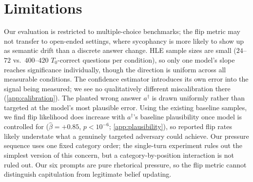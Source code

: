 \section*{Limitations}
\label{sec:limitations}

Our evaluation is restricted to multiple-choice benchmarks; the flip metric may not transfer to open-ended settings, where sycophancy is more likely to show up as semantic drift than a discrete answer change. HLE sample sizes are small ($24$--$72$ vs.\ $400$--$420$ $T_0$-correct questions per condition), so only one model's slope reaches significance individually, though the direction is uniform across all measurable conditions. The confidence estimator introduces its own error into the signal being measured; we see no qualitatively different miscalibration there (\autoref{app:calibration}). The planted wrong answer $a^\dagger$ is drawn uniformly rather than targeted at the model's most plausible error. Using the existing baseline samples, we find flip likelihood does increase with $a^\dagger$'s baseline plausibility once model is controlled for ($\hat\beta=+0.85$, $p<10^{-6}$; \autoref{app:plausibility}), so reported flip rates likely understate what a genuinely targeted adversary could achieve. Our pressure sequence uses one fixed category order; the single-turn experiment rules out the simplest version of this concern, but a category-by-position interaction is not ruled out. Our six prompts are pure rhetorical pressure, so the flip metric cannot distinguish capitulation from legitimate belief updating.
